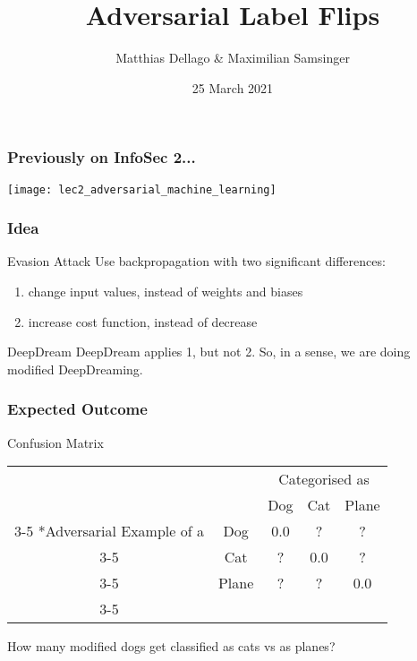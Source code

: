 \documentclass[10pt,usepdftitle=false,aspectratio=169]{beamer}
\title{Adversarial Label Flips}
\author{Matthias Dellago \& Maximilian Samsinger}
\date{25 March 2021}
\begin{document}
\DeclarePairedDelimiter\abs{\lvert}{\rvert}%
\DeclarePairedDelimiter\norm{\lVert}{\rVert}%
\DeclarePairedDelimiter\ceil{\lceil}{\rceil}
\DeclarePairedDelimiter\floor{\lfloor}{\rfloor}

\begin{frame}[plain]
	\maketitle
\end{frame}	

\begin{frame}[fragile]
	\frametitle{Previously on InfoSec 2...}
		\texttt{[image: lec2\_adversarial\_machine\_learning]}
\end{frame}

\begin{frame}[fragile]
	\frametitle{Idea}
		\begin{block}{Evasion Attack}
			Use backpropagation with two significant differences:
			\begin{enumerate}
				\item change input values, instead of weights and biases
				\item increase cost function, instead of decrease
			\end{enumerate} 
		\end{block}
		\begin{block}{DeepDream}
			DeepDream applies 1, but not 2. So, in a sense, we are doing modified DeepDreaming.
		\end{block}
\end{frame}

\begin{frame}[fragile]
	\frametitle{Expected Outcome}
	\begin{block}{Confusion Matrix}
		  \begin{table}
			\setlength{\extrarowheight}{2pt}
			\begin{tabular}{cc|c|c|c|}
				& \multicolumn{1}{c}{} & \multicolumn{3}{c}{Categorised as}\\
				& \multicolumn{1}{c}{} & \multicolumn{1}{c}{Dog}  & \multicolumn{1}{c}{Cat} & \multicolumn{1}{c}{Plane} \\\cline{3-5}
				\multirow{3}*{Adversarial Example of a}  & Dog & 0.0 & ? & ?\\\cline{3-5}
				& Cat & ? & 0.0 &  ? \\\cline{3-5}
				& Plane & ? & ? &  0.0 \\\cline{3-5}
			\end{tabular}
		\end{table}
	How many modified dogs get classified as cats vs as planes?
	\end{block}
\end{frame}
\end{document}
